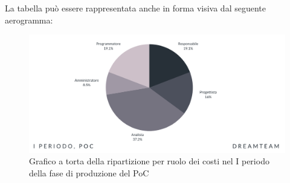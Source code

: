 La tabella può essere rappresentata anche in forma visiva dal seguente aerogramma:
\begin{figure}[!h]
\centering
\includegraphics[scale=0.65]{Sezioni/SezioniPreventivo/grafici/Poc_I_periodo_costi.png}
\caption{Grafico a torta della ripartizione per ruolo dei costi nel I periodo della fase di produzione del PoC}
\end{figure}



